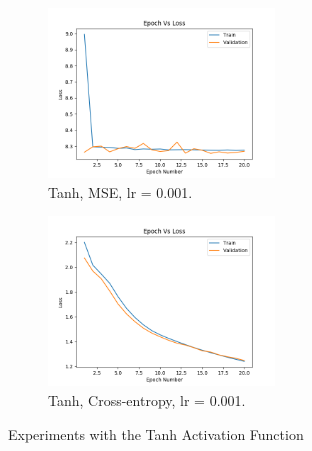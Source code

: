 \documentclass[12pt]{article}
\begin{document}
\begin{figure}
\begin{framed}
				\begin{subfigure}{5.5cm}
					\centering
					\includegraphics[width=6cm]{../Images/Epoch_VS_Loss/Tanh_MSE_0001.png}
					\captionsetup{justification=centering,margin=1cm}
					\caption{Tanh, MSE, lr = 0.001.}
					\label{fig:sub11}
				\end{subfigure}%
				\begin{subfigure}{5.5cm}
					\centering
					\includegraphics[width=6cm]{../Images/Epoch_VS_Loss/Tanh_cross-entropy_0001.png}
					\captionsetup{justification=centering,margin=0.4cm}
					\caption{Tanh, Cross-entropy, lr = 0.001.}
					\label{fig:sub12}
				\end{subfigure}	
				\end{framed}
				\captionsetup{justification=centering,margin=1cm}
				\caption{Experiments with the Tanh Activation Function}
				\label{Fig_2}
			\end{figure}
		
		\newpage
\end{document}
